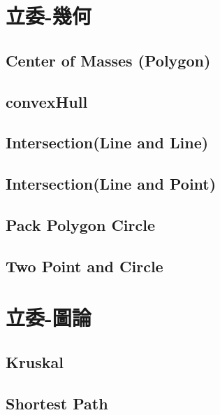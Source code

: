 \section{立委-幾何}
\subsection{Center of Masses (Polygon)}
\raggedbottom
\hrulefill
\subsection{convexHull}
\raggedbottom
\hrulefill
\subsection{Intersection(Line and Line)}
\raggedbottom
\hrulefill
\subsection{Intersection(Line and Point)}
\raggedbottom
\hrulefill
\subsection{Pack Polygon Circle}
\raggedbottom
\hrulefill
\subsection{Two Point and Circle}
\raggedbottom
\hrulefill

\section{立委-圖論}
\subsection{Kruskal}
\raggedbottom
\hrulefill
\subsection{Shortest Path}
\raggedbottom
\hrulefill

